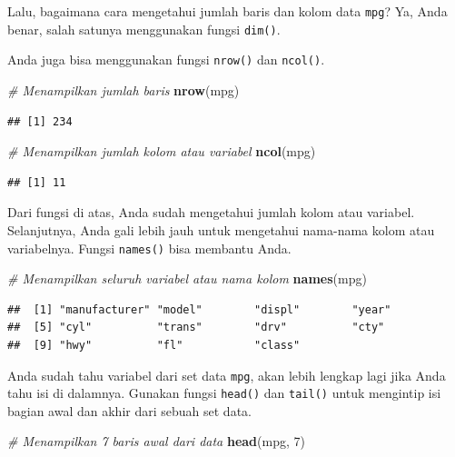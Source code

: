 \documentclass[openany]{book}
\newenvironment{Shaded}{\begin{snugshade}}{\end{snugshade}}
\newcommand{\KeywordTok}[1]{\textcolor[rgb]{0.13,0.29,0.53}{\textbf{#1}}}
\newcommand{\DecValTok}[1]{\textcolor[rgb]{0.00,0.00,0.81}{#1}}
\newcommand{\CommentTok}[1]{\textcolor[rgb]{0.56,0.35,0.01}{\textit{#1}}}
\newcommand{\NormalTok}[1]{#1}
\begin{document}
Lalu, bagaimana cara mengetahui jumlah baris dan kolom data
\texttt{mpg}? Ya, Anda benar, salah satunya menggunakan fungsi
\texttt{dim()}.

Anda juga bisa menggunakan fungsi \texttt{nrow()} dan \texttt{ncol()}.

\begin{Shaded}
\begin{Highlighting}[]
\CommentTok{# Menampilkan jumlah baris}
\KeywordTok{nrow}\NormalTok{(mpg)}
\end{Highlighting}
\end{Shaded}

\begin{verbatim}
## [1] 234
\end{verbatim}

\begin{Shaded}
\begin{Highlighting}[]
\CommentTok{# Menampilkan jumlah kolom atau variabel}
\KeywordTok{ncol}\NormalTok{(mpg)}
\end{Highlighting}
\end{Shaded}

\begin{verbatim}
## [1] 11
\end{verbatim}

Dari fungsi di atas, Anda sudah mengetahui jumlah kolom atau variabel.
Selanjutnya, Anda gali lebih jauh untuk mengetahui nama-nama kolom atau
variabelnya. Fungsi \texttt{names()} bisa membantu Anda.

\begin{Shaded}
\begin{Highlighting}[]
\CommentTok{# Menampilkan seluruh variabel atau nama kolom}
\KeywordTok{names}\NormalTok{(mpg)}
\end{Highlighting}
\end{Shaded}

\begin{verbatim}
##  [1] "manufacturer" "model"        "displ"        "year"        
##  [5] "cyl"          "trans"        "drv"          "cty"         
##  [9] "hwy"          "fl"           "class"
\end{verbatim}

Anda sudah tahu variabel dari set data \texttt{mpg}, akan lebih lengkap
lagi jika Anda tahu isi di dalamnya. Gunakan fungsi \texttt{head()} dan
\texttt{tail()} untuk mengintip isi bagian awal dan akhir dari sebuah
set data.

\begin{Shaded}
\begin{Highlighting}[]
\CommentTok{# Menampilkan 7 baris awal dari data}
\KeywordTok{head}\NormalTok{(mpg, }\DecValTok{7}\NormalTok{)}
\end{Highlighting}
\end{Shaded}
\end{document}
